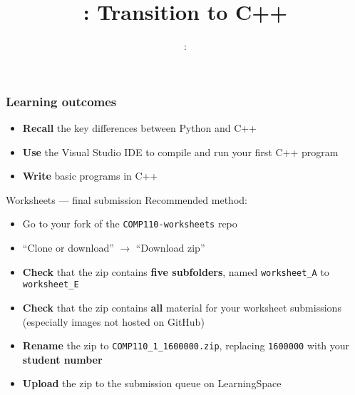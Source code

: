 \usepackage{../../beamerthemeFalmouthGamesAcademy}
\usepackage{multimedia}
\graphicspath{ {../../} }


\usepackage[normalem]{ulem}
\usepackage{wasysym}

\usepackage{pdfpages}

\usetikzlibrary{arrows,automata}




\title{\sessionnumber: Transition to C++}
\subtitle{\modulecode: \moduletitle}

\frame{\titlepage} 

\begin{frame}
	\frametitle{Learning outcomes}
	\begin{itemize}
      \item\textbf{Recall} the key differences between Python and C++
      \item\textbf{Use} the Visual Studio IDE to compile and run your first C++ program
      \item\textbf{Write} basic programs in C++
	\end{itemize}
\end{frame}

\begin{frame}{Worksheets --- final submission}
	Recommended method:
	\begin{itemize}
		\item Go to your fork of the \texttt{COMP110-worksheets} repo
		\item ``Clone or download'' $\to$ ``Download zip''
		\item \textbf{Check} that the zip contains \textbf{five subfolders}, named \texttt{worksheet\_A} to \texttt{worksheet\_E}
		\item \textbf{Check} that the zip contains \textbf{all} material for your worksheet submissions (especially images not hosted on GitHub)
		\item \textbf{Rename} the zip to \texttt{COMP110\_1\_1600000.zip}, replacing \texttt{1600000} with your \textbf{student number}
		\item \textbf{Upload} the zip to the submission queue on LearningSpace
	\end{itemize}
\end{frame}






